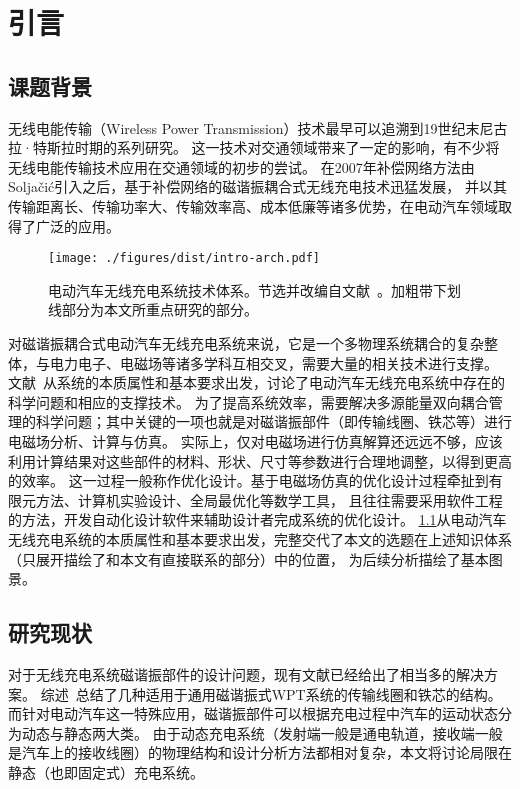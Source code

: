 \documentclass[index]{subfiles}
\begin{document}
\chapter{引言}\label{sec:intro}
\section{课题背景}
无线电能传输（Wireless Power Transmission）技术最早可以追溯到19世纪末尼古拉·特斯拉时期的系列研究\cite{barrett1894}。
这一技术对交通领域带来了一定的影响，有不少将无线电能传输技术应用在交通领域的初步的尝试\cite{eghtesadi1990}。
在2007年补偿网络方法由Solja\v{c}i\'c引入\cite{kurs2007}之后，基于补偿网络的磁谐振耦合式无线充电技术迅猛发展，
并以其传输距离长、传输功率大、传输效率高、成本低廉等诸多优势，在电动汽车领域取得了广泛的应用\cite{高大威2015}。

\begin{figure}[htb]
  \centering
  \texttt{[image: ./figures/dist/intro-arch.pdf]}
  \caption[本文选题在电动汽车无线充电系统技术体系中的地位]{电动汽车无线充电系统技术体系。节选并改编自文献~\cite{高大威2015}。加粗带下划线部分为本文所重点研究的部分。\label{fig:intro-arch}}
\end{figure}

对磁谐振耦合式电动汽车无线充电系统来说，它是一个多物理系统耦合的复杂整体，与电力电子、电磁场等诸多学科互相交叉，需要大量的相关技术进行支撑。
文献~从系统的本质属性和基本要求出发，讨论了电动汽车无线充电系统中存在的科学问题和相应的支撑技术。
为了提高系统效率，需要解决多源能量双向耦合管理的科学问题；其中关键的一项也就是对磁谐振部件（即传输线圈、铁芯等）进行电磁场分析、计算与仿真。
实际上，仅对电磁场进行仿真解算还远远不够，应该利用计算结果对这些部件的材料、形状、尺寸等参数进行合理地调整，以得到更高的效率。
这一过程一般称作优化设计。基于电磁场仿真的优化设计过程牵扯到有限元方法、计算机实验设计、全局最优化等数学工具，
且往往需要采用软件工程的方法，开发自动化设计软件来辅助设计者完成系统的优化设计。
\cref{fig:intro-arch}从电动汽车无线充电系统的本质属性和基本要求出发，完整交代了本文的选题在上述知识体系（只展开描绘了和本文有直接联系的部分）中的位置，
为后续分析描绘了基本图景。

\section{研究现状}
对于无线充电系统磁谐振部件的设计问题，现有文献已经给出了相当多的解决方案。
综述~\cite{张艺明2016}总结了几种适用于通用磁谐振式WPT系统的传输线圈和铁芯的结构。
而针对电动汽车这一特殊应用，磁谐振部件可以根据充电过程中汽车的运动状态分为动态与静态两大类\cite{赵争鸣2016}。
由于动态充电系统（发射端一般是通电轨道，接收端一般是汽车上的接收线圈）的物理结构和设计分析方法都相对复杂，本文将讨论局限在静态（也即固定式）充电系统。
\end{document}
